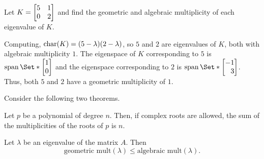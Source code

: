 \begin{example}
	Let $K=\mat{5&1\\0&2}$ and find the geometric and algebraic multiplicity of each eigenvalue of $K$.
	
	Computing, $\operatorname{char}(K)=(5-\lambda)(2-\lambda)$, so $5$ and $2$ are eigenvalues of $K$, both with algebraic multiplicity $1$.
	The eigenspace of $K$ corresponding to $5$ is $\Span\Set*{\mat{1\\0}}$ and the eigenspace
	corresponding to $2$ is $\Span\Set*{\mat{-1\\3}}$. Thus, both $5$ and $2$ have a geometric
	multiplicity of $1$.
\end{example}


Consider the following two theorems.

\begin{theorem}
	Let $p$ be a polynomial of degree $n$. Then, if complex roots are allowed,
	the sum of the multiplicities of the roots of $p$ is $n$.
\end{theorem}

\begin{theorem}
	Let $\lambda$ be an eigenvalue of the matrix $A$. Then
	\[
		\text{geometric mult}(\lambda)\leq \text{algebraic mult}(\lambda).
	\]
\end{theorem}

